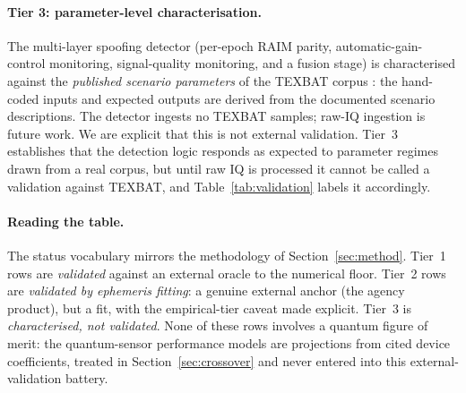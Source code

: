 \paragraph{Tier 3: parameter-level characterisation.}
The multi-layer spoofing detector (per-epoch RAIM parity, automatic-gain-control
monitoring, signal-quality monitoring, and a fusion stage) is characterised
against the \emph{published scenario parameters} of the TEXBAT corpus
\citep{humphreys2012texbat}: the hand-coded inputs and expected outputs are
derived from the documented scenario descriptions. The detector ingests no
TEXBAT samples; raw-IQ ingestion is future work. We are explicit that this is
not external validation. Tier~3 establishes that the detection logic responds as
expected to parameter regimes drawn from a real corpus, but until raw IQ is
processed it cannot be called a validation against TEXBAT, and Table~\ref{tab:validation}
labels it accordingly.

\paragraph{Reading the table.}
The status vocabulary mirrors the methodology of Section~\ref{sec:method}.
Tier~1 rows are \emph{validated} against an external oracle to the numerical
floor. Tier~2 rows are \emph{validated by ephemeris fitting}: a genuine
external anchor (the agency product), but a fit, with the empirical-tier caveat
made explicit. Tier~3 is \emph{characterised, not validated}. None of these
rows involves a quantum figure of merit: the quantum-sensor performance models
are projections from cited device coefficients, treated in
Section~\ref{sec:crossover} and never entered into this external-validation
battery.


